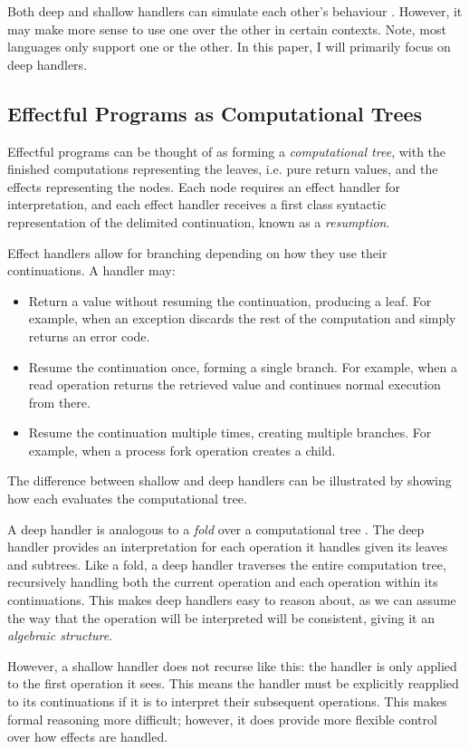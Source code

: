 \documentclass[logo,bsc,singlespacing,parskip]{infthesis}
\begin{document}
Both deep and shallow handlers can simulate each other's behaviour \cite{hillerstrom2018shallow}. However, it may make more sense to use one over the other in certain contexts. Note, most languages only support one or the other. In this paper, I will primarily focus on deep handlers.

\subsection{Effectful Programs as Computational Trees}
Effectful programs can be thought of as forming a \textit{computational tree}, with the finished computations representing the leaves, i.e. pure return values, and the effects representing the nodes. Each node requires an effect handler for interpretation, and each effect handler receives a first class syntactic representation of the delimited continuation, known as a \textit{resumption}. 

Effect handlers allow for branching depending on how they use their continuations. A handler may: 
\begin{itemize}
    \item Return a value without resuming the continuation, producing a leaf. For example, when an exception discards the rest of the computation and simply returns an error code.
    \item Resume the continuation once, forming a single branch. For example, when a read operation returns the retrieved value and continues normal execution from there. 
    \item Resume the continuation multiple times, creating multiple branches. For example, when a process fork operation creates a child.
\end{itemize}


The difference between shallow and deep handlers can be illustrated by showing how each evaluates the computational tree.

A deep handler is analogous to a \textit{fold} over a computational tree \cite{hillerstrom_foundations_nodate}. The deep handler provides an interpretation for each operation it handles given its leaves and subtrees. Like a fold, a deep handler traverses the entire computation tree, recursively handling both the current operation and each operation within its continuations. This makes deep handlers easy to reason about, as we can assume the way that the operation will be interpreted will be consistent, giving it an \textit{algebraic structure}. 

However, a shallow handler does not recurse like this: the handler is only applied to the first operation it sees. This means the handler must be explicitly reapplied to its continuations if it is to interpret their subsequent operations. This makes formal reasoning more difficult; however,  it does provide more flexible control over how effects are handled.
\end{document}
